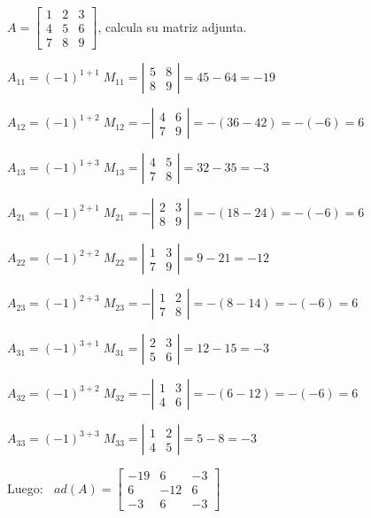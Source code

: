 \begin{ejem} $A=\left[ \begin{matrix} 1&2&3 \\ 4&5&6 \\ 7&8&9 \end{matrix} \right]$, calcula su matriz adjunta.

$A_{11}=(-1)^{1+1}\; M_{11} =\left| \begin{matrix} 5&8\\8&9 \end{matrix} \right| = 45-64=-19$

$A_{12}=(-1)^{1+2}\; M_{12} =- \left| \begin{matrix} 4&6\\7&9 \end{matrix} \right| =- (36-42)=-(-6)=6$

$A_{13}=(-1)^{1+3}\; M_{13} =\left| \begin{matrix} 4&5\\7&8 \end{matrix} \right| = 32-35=-3$

$A_{21}=(-1)^{2+1}\; M_{21} =-\left| \begin{matrix} 2&3\\8&9 \end{matrix} \right| = -(18-24)=-(-6)=6$

$A_{22}=(-1)^{2+2}\; M_{22} =\left| \begin{matrix} 1&3\\7&9 \end{matrix} \right| = 9-21=-12$

$A_{23}=(-1)^{2+3}\; M_{23} =-\left| \begin{matrix} 1&2\\7&8 \end{matrix} \right| = -(8-14)=-(-6)=6$

$A_{31}=(-1)^{3+1}\; M_{31} =\left| \begin{matrix} 2&3\\5&6 \end{matrix} \right| = 12-15=-3$

$A_{32}=(-1)^{3+2}\; M_{32} =- \left| \begin{matrix} 1&3\\4&6 \end{matrix} \right| = -(6-12)=-(-6)=6$

$A_{33}=(-1)^{3+3}\; M_{33} =\left| \begin{matrix} 1&2\\4&5 \end{matrix} \right| = 5-8=-3$

Luego: $\; \; ad(A)=\left[ \begin{matrix} -19&6&-3\\6&-12&6\\-3&6&-3\end{matrix} \right]$

\end{ejem}


